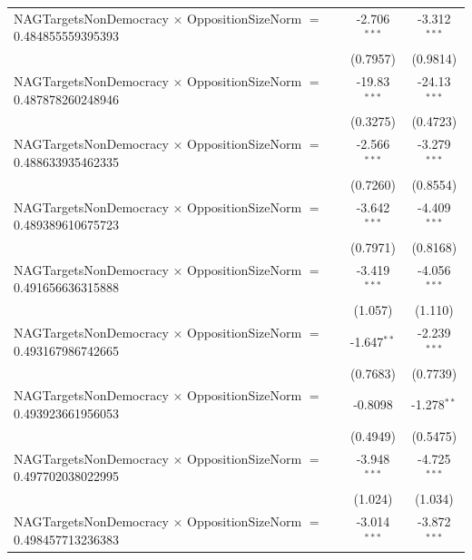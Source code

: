 \begin{tabular}{lcc}
   NAGTargetsNonDemocracy $\times$ OppositionSizeNorm $=$ 0.484855559395393     & -2.706$^{***}$       & -3.312$^{***}$\\   
                                                                                & (0.7957)             & (0.9814)\\   
   NAGTargetsNonDemocracy $\times$ OppositionSizeNorm $=$ 0.487878260248946     & -19.83$^{***}$       & -24.13$^{***}$\\   
                                                                                & (0.3275)             & (0.4723)\\   
   NAGTargetsNonDemocracy $\times$ OppositionSizeNorm $=$ 0.488633935462335     & -2.566$^{***}$       & -3.279$^{***}$\\   
                                                                                & (0.7260)             & (0.8554)\\   
   NAGTargetsNonDemocracy $\times$ OppositionSizeNorm $=$ 0.489389610675723     & -3.642$^{***}$       & -4.409$^{***}$\\   
                                                                                & (0.7971)             & (0.8168)\\   
   NAGTargetsNonDemocracy $\times$ OppositionSizeNorm $=$ 0.491656636315888     & -3.419$^{***}$       & -4.056$^{***}$\\   
                                                                                & (1.057)              & (1.110)\\   
   NAGTargetsNonDemocracy $\times$ OppositionSizeNorm $=$ 0.493167986742665     & -1.647$^{**}$        & -2.239$^{***}$\\   
                                                                                & (0.7683)             & (0.7739)\\   
   NAGTargetsNonDemocracy $\times$ OppositionSizeNorm $=$ 0.493923661956053     & -0.8098              & -1.278$^{**}$\\   
                                                                                & (0.4949)             & (0.5475)\\   
   NAGTargetsNonDemocracy $\times$ OppositionSizeNorm $=$ 0.497702038022995     & -3.948$^{***}$       & -4.725$^{***}$\\   
                                                                                & (1.024)              & (1.034)\\   
   NAGTargetsNonDemocracy $\times$ OppositionSizeNorm $=$ 0.498457713236383     & -3.014$^{***}$       & -3.872$^{***}$\\   

\end{tabular}
